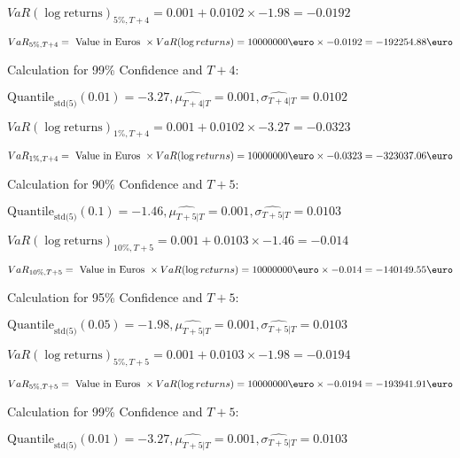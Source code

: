 \indent\indent $VaR(\log \text{returns})_{5\%, T + 4} = 0.001 + 0.0102\times-1.98 = -0.0192$

\indent\indent $VaR_{5\%, T + 4} = \text{ Value in Euros } \times VaR(\log returns) = 10 000 000 \text{\euro} \times-0.0192 = -192254.88 \text{\euro}$\newline




Calculation for 99\% Confidence and $T+4$:

\indent\indent $\text{Quantile}_\text{std(5)}(0.01) = -3.27,\hat{\mu_{T+4|T}} = 0.001, \hat{\sigma_{T+4|T}} = 0.0102$

\indent\indent $VaR(\log \text{returns})_{1\%, T + 4} = 0.001 + 0.0102\times-3.27 = -0.0323$

\indent\indent $VaR_{1\%, T + 4} = \text{ Value in Euros } \times VaR(\log returns) = 10 000 000 \text{\euro} \times-0.0323 = -323037.06 \text{\euro}$\newline




Calculation for 90\% Confidence and $T+5$:

\indent\indent $\text{Quantile}_\text{std(5)}(0.1) = -1.46,\hat{\mu_{T+5|T}} = 0.001, \hat{\sigma_{T+5|T}} = 0.0103$

\indent\indent $VaR(\log \text{returns})_{10\%, T + 5} = 0.001 + 0.0103\times-1.46 = -0.014$

\indent\indent $VaR_{10\%, T + 5} = \text{ Value in Euros } \times VaR(\log returns) = 10 000 000 \text{\euro} \times-0.014 = -140149.55 \text{\euro}$\newline




Calculation for 95\% Confidence and $T+5$:

\indent\indent $\text{Quantile}_\text{std(5)}(0.05) = -1.98,\hat{\mu_{T+5|T}} = 0.001, \hat{\sigma_{T+5|T}} = 0.0103$

\indent\indent $VaR(\log \text{returns})_{5\%, T + 5} = 0.001 + 0.0103\times-1.98 = -0.0194$

\indent\indent $VaR_{5\%, T + 5} = \text{ Value in Euros } \times VaR(\log returns) = 10 000 000 \text{\euro} \times-0.0194 = -193941.91 \text{\euro}$\newline




Calculation for 99\% Confidence and $T+5$:

\indent\indent $\text{Quantile}_\text{std(5)}(0.01) = -3.27,\hat{\mu_{T+5|T}} = 0.001, \hat{\sigma_{T+5|T}} = 0.0103$

